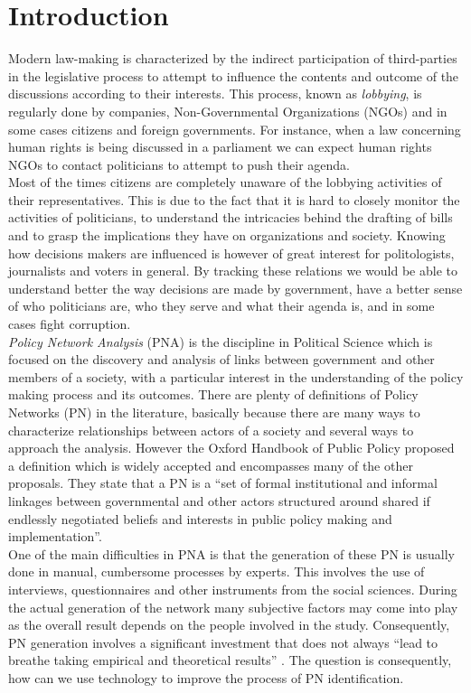 \section{Introduction}\label{sec:intro}

Modern law-making is characterized by the indirect participation of third-parties in the legislative process to attempt to influence the contents and outcome of the discussions according to their interests. This process, known as \emph{lobbying}, is regularly done by companies, Non-Governmental Organizations (NGOs) and in some cases citizens and foreign governments. For instance, when a law concerning human rights is being discussed in a parliament we can expect human rights NGOs to contact politicians to attempt to push their agenda. \\

Most of the times citizens are completely unaware of the lobbying activities of their representatives. This is due to the fact that it is hard to closely monitor the activities of politicians, to understand the intricacies behind the drafting of bills and to grasp the implications they have on organizations and society. Knowing how decisions makers are influenced is however of great interest for politologists, journalists and voters in general. By tracking these relations we would be able to understand better the way decisions are made by government, have a better sense of who politicians are, who they serve and what their agenda is, and in some cases fight corruption. \\

\emph{Policy Network Analysis} (PNA) is the discipline in Political Science which is focused on the discovery and analysis of links between government and other members of a society, with a particular interest in the understanding of the policy making process and its outcomes. There are plenty of definitions of Policy Networks (PN) in the literature, basically because there are many ways to characterize relationships between actors of a society and several ways to approach the analysis. However the Oxford Handbook of Public Policy proposed a definition which is widely accepted and encompasses many of the other proposals. They state that a PN is a ``set of formal institutional and informal linkages between governmental and other actors structured around shared if endlessly negotiated beliefs and interests in public policy making and implementation''\cite{moran2008oxford}. \\

One of the main difficulties in PNA is that the generation of these PN is usually done in manual, cumbersome processes by experts. This involves the use of interviews, questionnaires and other instruments from the social sciences. During the actual generation of the network many subjective factors may come into play as the overall result depends on the people involved in the study. Consequently, PN generation involves a significant investment that does not always ``lead to breathe taking empirical and theoretical results'' \cite{kenis1991policy}. The question is consequently, how can we use technology to improve the process of PN identification. \\

